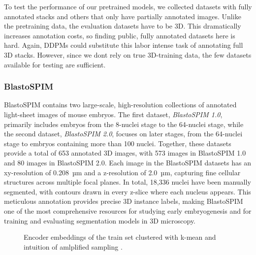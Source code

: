 To test the performance of our pretrained models, we collected datasets with fully annotated stacks and others that only have partially annotated images. Unlike the pretraining data, the evaluation datasets have to be 3D. This dramatically increases annotation costs, so finding public, fully annotated datasets here is hard. Again, DDPMs could substitute this labor intense task of annotating full 3D stacks. However, since we dont rely on true 3D-training data, the few datasets available for testing are sufficient.

\subsubsection{BlastoSPIM}

BlastoSPIM contains two large-scale, high-resolution collections of annotated light-sheet images of mouse embryos.
The first dataset, \textit{BlastoSPIM 1.0}, primarily includes embryos from the 8-nuclei stage to the 64-nuclei stage, while the second dataset, \textit{BlastoSPIM 2.0}, focuses on later stages, from the 64-nuclei stage to embryos containing more than 100 nuclei. Together, these datasets provide a total of 653 annotated 3D images, with 573 images in BlastoSPIM 1.0 and 80 images in BlastoSPIM 2.0.
Each image in the BlastoSPIM datasets has an xy-resolution of 0.208~µm and a z-resolution of 2.0~µm, capturing fine cellular structures across multiple focal planes. In total, 18,336 nuclei have been manually segmented, with contours drawn in every z-slice where each nucleus appears. This meticulous annotation provides precise 3D instance labels, making BlastoSPIM one of the most comprehensive resources for studying early embryogenesis and for training and evaluating segmentation models in 3D microscopy. 

\begin{figure}[!ht]
    \centering
    \caption{Encoder embeddings of the train set clustered with k-mean and intuition of amlplified sampling \cite{LeCun.1989}.}
    \label{fig:slicing}
\end{figure}

